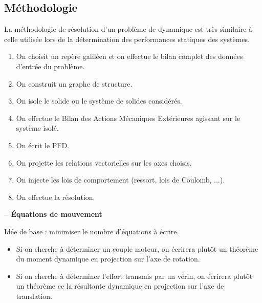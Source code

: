 \subsection{Méthodologie}

\begin{methode}
La méthodologie de résolution d'un problème de dynamique est très similaire à celle utilisée lors de la détermination des performances statiques des systèmes.

\begin{enumerate}
\item On choisit un repère galiléen et on effectue le bilan complet des données d'entrée du problème.
\item On construit un graphe de structure.
\item On isole le solide ou le système de solides considérés.
\item On effectue le Bilan des Actions Mécaniques Extérieures agissant sur le système isolé.
\item On écrit le PFD.
\item On projette les relations vectorielles sur les axes choisis.
\item On injecte les lois de comportement (ressort, lois de Coulomb, ...).
\item On effectue la résolution.
\end{enumerate}
\end{methode}

\begin{methode}\textbf{\textsf{\small -- Équations de mouvement}}

Idée de base : minimiser le nombre d'équations à écrire. 
\begin{itemize}
\item Si on cherche à déterminer un couple moteur, on écrirera plutôt un théorème du moment dynamique en projection sur l'axe de rotation.
\item Si on cherche à déterminer l'effort transmis par un vérin, on écrirera plutôt un théorème ce la résultante dynamique en projection sur l'axe de translation.
\end{itemize}

\end{methode}



